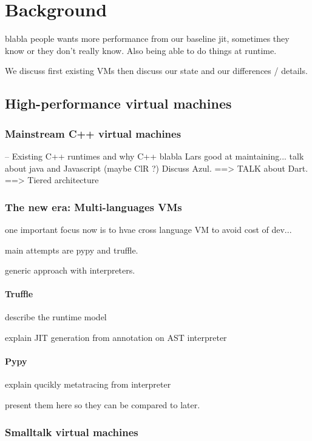\documentclass[a4paper,12pt,twoside]{../includes/ThesisStyle}
\begin{document}
\fi

\chapter{Background}
\label{chap:background}
\minitoc

blabla people wants more performance from our baseline jit, sometimes they know or they don't really know.
Also being able to do things at runtime.

We discuss first existing VMs then discuss our state and our differences / details. 

\section{High-performance virtual machines}

\subsection{Mainstream C++ virtual machines}
-- Existing C++ runtimes and why C++ blabla Lars good at maintaining...
talk about java and Javascript (maybe ClR ?) Discuss Azul.
==> TALK about Dart.
==> Tiered architecture

\subsection{The new era: Multi-languages VMs}

one important focus now is to hvae cross language VM to avoid cost of dev...

main attempts are pypy and truffle.

generic approach with interpreters.

\subsubsection{Truffle}

describe the runtime model

explain JIT generation from annotation on AST interpreter

\subsubsection{Pypy}

explain qucikly metatracing from interpreter

present them here so they can be compared to later.

\subsection{Smalltalk virtual machines}
\end{document}

